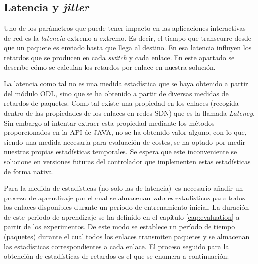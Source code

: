 \documentclass[a4paper,11pt]{book}
\begin{document}
%
\subsection{Latencia y \textit{jitter}} \label{latency}

 Uno de los parámetros que puede tener impacto en las aplicaciones interactivas de red es la \emph{latencia} extremo a extremo. Es decir, el tiempo que transcurre desde que un paquete es enviado hasta que llega al destino.
 En esa latencia influyen los retardos que se producen en cada \emph{switch} y cada enlace. En este apartado se describe cómo se calculan los retardos por enlace en nuestra solución.
 
 La latencia como tal no es una medida estadística que se haya obtenido a partir del módulo \ac{ODL}, sino que se ha obtenido a partir de diversas medidas de retardos de paquetes. Como tal existe una propiedad en los enlaces (recogida dentro de las propiedades de los enlaces en redes \ac{SDN}) que es la llamada \emph{Latency}. Sin embargo al intentar extraer esta propiedad mediante los métodos proporcionados en la \ac{API} de JAVA, no se ha obtenido valor alguno, con lo que, siendo una medida necesaria para evaluación de costes, se ha optado por medir nuestras propias estadísticas temporales. Se espera que este inconveniente se solucione en versiones futuras del controlador que implementen estas estadísticas de forma nativa.

Para la medida de estadísticas (no solo las de latencia), es necesario añadir un proceso de aprendizaje por el cual se almacenan valores estadísticos para todos los enlaces disponibles durante un periodo de entrenamiento inicial. La duración de este periodo de aprendizaje se ha definido en el capítulo \ref{cap:evaluation} a partir de los experimentos. De este modo se establece un período de tiempo (paquetes) durante el cual todos los enlaces transmiten paquetes y se almacenan las estadísticas correspondientes a cada enlace. El proceso seguido para la obtención de estadísticas de retardos es el que se enumera a continuación:
 
\end{document}
